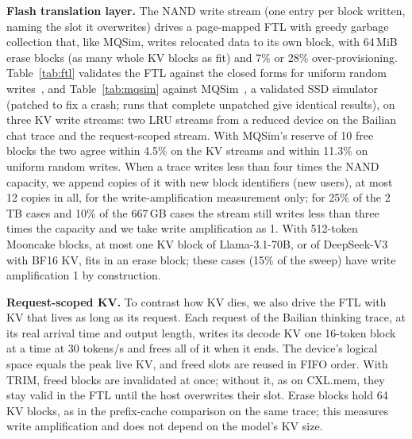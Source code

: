 \documentclass[acmsmall,screen,review]{acmart}
\begin{document}
\textbf{Flash translation layer.} The NAND write stream (one entry per block written, naming the
slot it overwrites) drives a page-mapped FTL with greedy garbage collection that, like MQSim,
writes relocated data to its own block, with 64\,MiB erase blocks (as many whole KV blocks as fit)
and 7\% or 28\% over-provisioning. Table~\ref{tab:ftl} validates the FTL against the closed forms
for uniform random writes~\cite{desnoyers}, and Table~\ref{tab:mqsim} against MQSim~\cite{mqsim},
a validated SSD simulator (patched to fix a crash; runs that complete unpatched give identical
results), on three KV write streams: two LRU streams from a reduced device on the Bailian chat
trace and the request-scoped stream. With MQSim's reserve of 10 free blocks the two agree within
4.5\% on the KV streams and within 11.3\% on uniform random writes. When a trace writes less than four
times the NAND capacity, we append copies of it with new block identifiers (new users), at most 12
copies in all, for the write-amplification measurement only; for 25\% of the 2\,TB cases and 10\% of
the 667\,GB cases the stream still writes less than three times the capacity and we take write
amplification as 1. With 512-token
Mooncake blocks, at most one KV block of Llama-3.1-70B, or of DeepSeek-V3 with BF16 KV, fits in an
erase block; these cases (15\% of the sweep) have write amplification 1 by construction.

\begin{table}[t]
\caption{FTL validation: uniform random overwrites, 40{,}000 units, 64 units per erase block.
Effective over-provisioning excludes the reserved free blocks.}
\label{tab:ftl}
\small

\end{table}

\begin{table}[t]
\caption{Write amplification on exported KV write streams and on uniform random writes (64 units
per erase block): MQSim and our FTL with MQSim's 10 reserved free blocks. MQSim collects up to 10
victims concurrently; with 9 more physical blocks, MQSim gives 7.52 on uniform writes at 7\%,
against 7.91 for our FTL.}
\label{tab:mqsim}
\small

\end{table}

\textbf{Request-scoped KV.} To contrast how KV dies, we also drive the FTL with KV that lives as long
as its request. Each request of the Bailian thinking trace, at its real arrival time and output
length, writes its decode KV one 16-token block at a time at 30 tokens/s and frees all of it when it
ends. The device's logical space equals the peak live KV, and freed slots are reused in FIFO order.
With TRIM, freed blocks are invalidated at once; without it, as on CXL.mem, they stay valid in the
FTL until the host overwrites their slot. Erase blocks hold 64 KV blocks, as in the prefix-cache
comparison on the same trace; this measures write amplification and does not depend on the model's
KV size.
\end{document}
